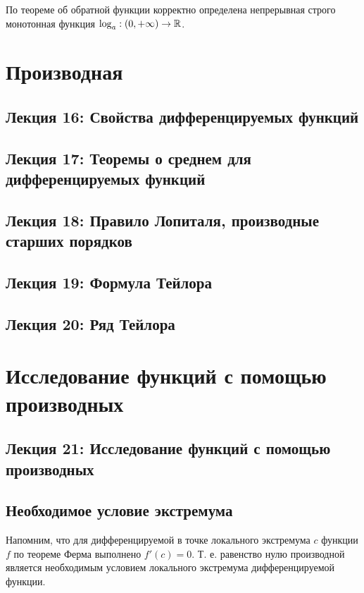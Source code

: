 	По теореме об обратной функции корректно определена
	непрерывная строго монотонная функция $\log_a : (0, +\infty) \rightarrow \mathbb R$.
	
	\chapter{Производная}
	
	\section*{Лекция 16: Свойства дифференцируемых функций}
	
	\section*{Лекция 17: Теоремы о среднем для дифференцируемых функций}
	
	\section*{Лекция 18: Правило Лопиталя, производные старших порядков}
	
	\section*{Лекция 19: Формула Тейлора}
	
	\section*{Лекция 20: Ряд Тейлора}
	
	\chapter{Исследование функций с помощью производных}
	
	\section*{Лекция 21: Исследование функций с помощью производных}
	
	\section{Необходимое условие экстремума}
	
	Напомним, что для дифференцируемой в точке локального экстремума $c$ функции $f$ по теореме Ферма выполнено $f'(c) = 0$. Т. е. равенство нулю производной является необходимым условием локального экстремума дифференцируемой функции. 
	
